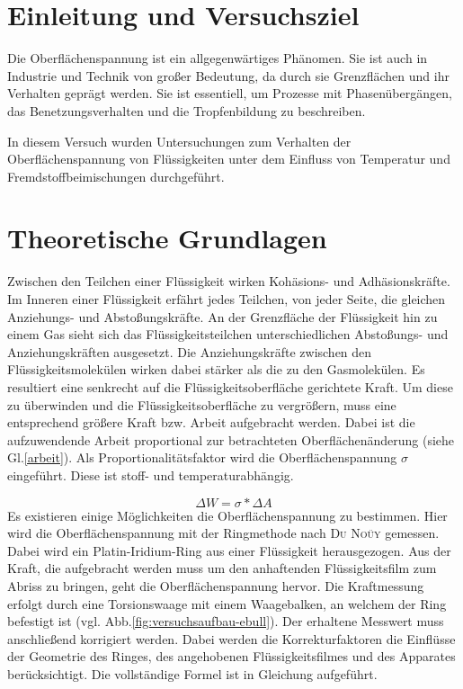 \section{Einleitung und Versuchsziel}
\label{sec:aufgabenstellung}
Die Oberflächenspannung ist ein allgegenwärtiges Phänomen. Sie ist auch in Industrie und Technik von großer Bedeutung, da  durch sie Grenzflächen und ihr Verhalten geprägt werden. Sie ist essentiell, um Prozesse mit Phasenübergängen, das Benetzungsverhalten und die Tropfenbildung zu beschreiben.

In diesem Versuch wurden Untersuchungen zum Verhalten der Oberflächenspannung von Flüssigkeiten unter dem Einfluss von Temperatur und Fremdstoffbeimischungen durchgeführt. 

\section{Theoretische Grundlagen}

Zwischen den Teilchen einer Flüssigkeit wirken Kohäsions- und Adhäsionskräfte. Im Inneren einer Flüssigkeit erfährt jedes Teilchen, von jeder Seite, die gleichen Anziehungs- und Abstoßungskräfte. An der Grenzfläche der Flüssigkeit hin zu einem Gas sieht sich das Flüssigkeitsteilchen unterschiedlichen Abstoßungs- und Anziehungskräften ausgesetzt. Die Anziehungskräfte zwischen den Flüssigkeitsmolekülen wirken dabei stärker als die zu den Gasmolekülen. Es resultiert eine senkrecht auf die Flüssigkeitsoberfläche gerichtete Kraft. Um diese zu überwinden und die Flüssigkeitsoberfläche zu vergrößern, muss eine entsprechend größere Kraft bzw. Arbeit aufgebracht werden. Dabei ist die aufzuwendende Arbeit proportional zur betrachteten Oberflächenänderung (siehe Gl.\eqref{arbeit}). Als Proportionalitätsfaktor wird die Oberflächenspannung $\sigma$ eingeführt. Diese ist stoff- und temperaturabhängig. 

\begin{equation}\label{arbeit}
	\Delta W=\sigma*\Delta A
\end{equation}
Es existieren einige Möglichkeiten die Oberflächenspannung zu bestimmen. Hier wird die Oberflächenspannung mit der Ringmethode nach \textsc{Du Noüy} gemessen. Dabei wird ein Platin-Iridium-Ring aus einer Flüssigkeit herausgezogen. Aus der Kraft, die aufgebracht werden muss um den anhaftenden Flüssigkeitsfilm zum Abriss zu bringen, geht die Oberflächenspannung hervor. Die Kraftmessung erfolgt durch eine Torsionswaage mit einem Waagebalken, an welchem der Ring befestigt ist (vgl. Abb.\ref{fig:versuchsaufbau-ebull}). Der erhaltene Messwert muss anschließend korrigiert werden. Dabei werden die Korrekturfaktoren die Einflüsse der Geometrie des Ringes, des angehobenen Flüssigkeitsfilmes und des Apparates berücksichtigt. Die vollständige Formel ist in Gleichung aufgeführt.

